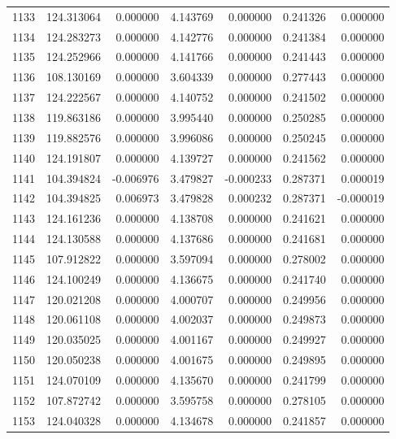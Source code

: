 \begin{tabular}{rrrrrrr}
1133 & 124.313064 &    0.000000 &  4.143769 &    0.000000 &    0.241326 &  0.000000 \\
1134 & 124.283273 &    0.000000 &  4.142776 &    0.000000 &    0.241384 &  0.000000 \\
1135 & 124.252966 &    0.000000 &  4.141766 &    0.000000 &    0.241443 &  0.000000 \\
1136 & 108.130169 &    0.000000 &  3.604339 &    0.000000 &    0.277443 &  0.000000 \\
1137 & 124.222567 &    0.000000 &  4.140752 &    0.000000 &    0.241502 &  0.000000 \\
1138 & 119.863186 &    0.000000 &  3.995440 &    0.000000 &    0.250285 &  0.000000 \\
1139 & 119.882576 &    0.000000 &  3.996086 &    0.000000 &    0.250245 &  0.000000 \\
1140 & 124.191807 &    0.000000 &  4.139727 &    0.000000 &    0.241562 &  0.000000 \\
1141 & 104.394824 &   -0.006976 &  3.479827 &   -0.000233 &    0.287371 &  0.000019 \\
1142 & 104.394825 &    0.006973 &  3.479828 &    0.000232 &    0.287371 & -0.000019 \\
1143 & 124.161236 &    0.000000 &  4.138708 &    0.000000 &    0.241621 &  0.000000 \\
1144 & 124.130588 &    0.000000 &  4.137686 &    0.000000 &    0.241681 &  0.000000 \\
1145 & 107.912822 &    0.000000 &  3.597094 &    0.000000 &    0.278002 &  0.000000 \\
1146 & 124.100249 &    0.000000 &  4.136675 &    0.000000 &    0.241740 &  0.000000 \\
1147 & 120.021208 &    0.000000 &  4.000707 &    0.000000 &    0.249956 &  0.000000 \\
1148 & 120.061108 &    0.000000 &  4.002037 &    0.000000 &    0.249873 &  0.000000 \\
1149 & 120.035025 &    0.000000 &  4.001167 &    0.000000 &    0.249927 &  0.000000 \\
1150 & 120.050238 &    0.000000 &  4.001675 &    0.000000 &    0.249895 &  0.000000 \\
1151 & 124.070109 &    0.000000 &  4.135670 &    0.000000 &    0.241799 &  0.000000 \\
1152 & 107.872742 &    0.000000 &  3.595758 &    0.000000 &    0.278105 &  0.000000 \\
1153 & 124.040328 &    0.000000 &  4.134678 &    0.000000 &    0.241857 &  0.000000 \\

\end{tabular}
